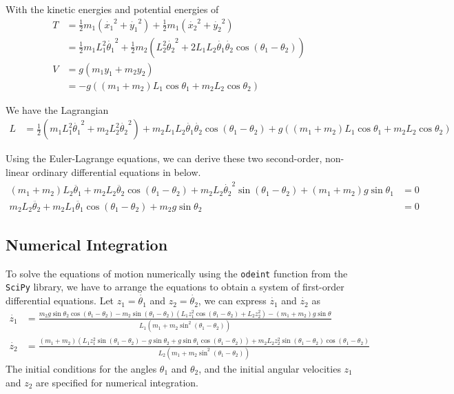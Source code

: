 \documentclass[12pt]{article}
\begin{document}
\noindent With the kinetic energies and potential energies of \begin{align*}
    T &= \frac{1}{2} m_1 (\dot{x_1}^2 + \dot{y_1}^2) + \frac{1}{2} m_1 (\dot{x_2}^2 + \dot{y_2}^2) \\
    &= \frac{1}{2} m_1 L_1^2 \dot{\theta_1}^2 + \frac{1}{2} m_2 (L_2^2 \dot{\theta_2}^2 + 2 L_1 L_2 \dot{\theta_1} \dot{\theta_2} \cos(\theta_1 - \theta_2)) \\
    V &= g(m_1 y_1 + m_2 y_2) \\
    &= -g((m_1 + m_2) L_1 \cos \theta_1 + m_2 L_2 \cos \theta_2)
\end{align*}

\noindent We have the Lagrangian \begin{align*}
    L &= \frac{1}{2} (m_1 L_1^2 \dot{\theta_1}^2 + m_2 L_2^2 \dot{\theta_2}^2) + m_2 L_1 L_2 \dot{\theta_1} \dot{\theta_2} \cos(\theta_1 - \theta_2) + g((m_1 + m_2) L_1 \cos \theta_1 + m_2 L_2 \cos \theta_2)
\end{align*}

\noindent Using the Euler-Lagrange equations, we can derive these two second-order, non-linear ordinary differential equations\cite{christian_2017} in below.
\begin{align*}
    (m_1 + m_2)L_2 \ddot{\theta_1} + m_2 L_2 \ddot{\theta_2} \cos(\theta_1 - \theta_2) + m_2 L_2 \dot{\theta_2}^2 \sin(\theta_1 - \theta_2) + (m_1 + m_2)g \sin\theta_1 &= 0 \\
    m_2 L_2 \ddot{\theta_2} + m_2 L_1 \ddot{\theta_1} \cos(\theta_1 - \theta_2) + m_2 g \sin\theta_2 &= 0
\end{align*}

\subsection{Numerical Integration}
To solve the equations of motion numerically using the \texttt{odeint} function from the \texttt{SciPy} library, we have to arrange the equations to obtain a system of first-order differential equations.
Let $z_1 = \dot{\theta_1}$ and $z_2 = \dot{\theta_2}$, we can express $\dot{z_1}$ and $\dot{z_2}$ as \begin{align*}
    \dot{z_1} &= \frac{m_2 g \sin\theta_2 \cos(\theta_1 - \theta_2) - m_2 \sin(\theta_1 - \theta_2)(L_1 z_1^2 \cos(\theta_1 - \theta_2) + L_2 z_2^2) - (m_1 + m_2)g \sin\theta}{L_1 (m_1 + m_2 \sin^2(\theta_1 - \theta_2))} \\
    \dot{z_2} &= \frac{(m_1 + m_2) (L_1 z_1^2 \sin(\theta_1 - \theta_2) - g \sin\theta_2 + g \sin\theta_1 \cos(\theta_1 - \theta_2)) + m_2 L_2 z_2^2 \sin(\theta_1 - \theta_2) \cos(\theta_1 - \theta_2)}{L_2 (m_1 + m_2 \sin^2(\theta_1 - \theta_2))}
\end{align*}  
The initial conditions for the angles $\theta_1$ and $\theta_2$, and the initial angular velocities $z_1$ and $z_2$ are specified for numerical integration.
\end{document}

